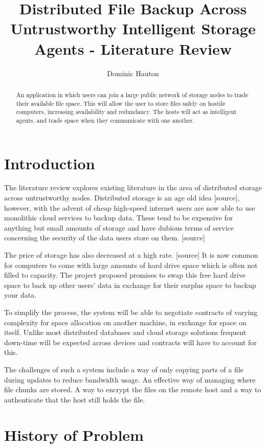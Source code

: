 \documentclass[a4paper,10pt]{article}
\title{Distributed File Backup Across Untrustworthy Intelligent Storage Agents - Literature Review}
\author{Dominic Hauton}
\begin{document}
\maketitle

\begin{abstract}
An application in which users can join a large public network of storage nodes to trade their available file space. This will allow the user to store files safely on hostile computers, increasing availability and redundancy. The hosts will act as intelligent agents, and trade space when they communicate with one another.
\end{abstract}

\section{Introduction}
The literature review explores existing literature in the area of distributed storage across untrustworthy nodes. Distributed storage is an age old idea [source], however, with the advent of cheap high-speed internet users are now able to use monolithic cloud services to backup data. These tend to be expensive for anything but small amounts of storage and have dubious terms of service concerning the security of the data users store on them. [source]

The price of storage has also decreased at a high rate. [source] It is now common for computers to come with large amounts of hard drive space which is often not filled to capacity. The project proposed promises to swap this free hard drive space to back up other users’ data in exchange for their surplus space to backup your data.

To simplify the process, the system will be able to negotiate contracts of varying complexity for space allocation on another machine, in exchange for space on itself. Unlike most distributed databases and cloud storage solutions frequent down-time will be expected across devices and contracts will have to account for this.

The challenges of such a system include a way of only copying parts of a file during updates to reduce bandwidth usage. An effective way of managing where file chunks are stored. A way to encrypt the files on the remote host and a way to authenticate that the host still holds the file.

\section{History of Problem}
\end{document}

